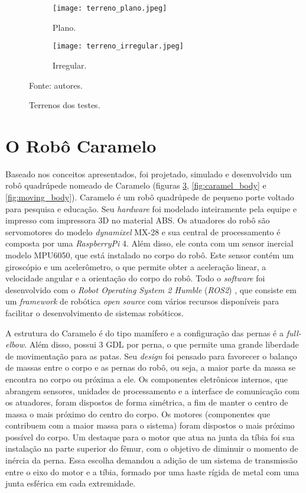 \documentclass[conference]{IEEEtran}
\begin{document}
  \begin{figure}[htbp]
    \centering
    \begin{subfigure}[htbp]{0.24\textwidth}
      \centering
      \texttt{[image: terreno\_plano.jpeg]}
      \caption{Plano.}
      \label{fig:terreno_plano}
    \end{subfigure}
    \begin{subfigure}[htbp]{0.24\textwidth}
      \centering
      \texttt{[image: terreno\_irregular.jpeg]}
      \caption{Irregular.}
      \label{fig:terreno_irregular}
    \end{subfigure}
    \vfill
    \caption{Terrenos dos testes.}
    Fonte: autores.
    \label{fig:terrenos}
  \end{figure}

\section{O Robô Caramelo}

Baseado nos conceitos apresentados, foi projetado, simulado e desenvolvido um robô quadrúpede nomeado de Caramelo (figuras \ref{fig:terrenos}, \ref{fig:caramel_body} e \ref{fig:moving_body}). Caramelo é um robô quadrúpede de pequeno porte voltado para pesquisa e educação. Seu \textit{hardware} foi modelado inteiramente pela equipe e impresso com impressora 3D no material ABS. Os atuadores do robô são servomotores do modelo \textit{dynamixel} MX-28 e sua central de processamento é composta por uma \textit{RaspberryPi} 4. Além disso, ele conta com um sensor inercial modelo MPU6050, que está instalado no corpo do robô. Este sensor contém um giroscópio e um acelerômetro, o que permite obter a aceleração linear, a velocidade angular e a orientação do corpo do robô. Todo o \textit{software} foi desenvolvido com o \textit{Robot Operating System 2 Humble} (\textit{ROS2}) \cite{ROS2Humble}, que consiste em um \textit{framework} de robótica \textit{open source} com vários recursos disponíveis para facilitar o desenvolvimento de sistemas robóticos.

A estrutura do Caramelo é do tipo mamífero e a configuração das pernas é a \textit{full-elbow}. Além disso, possui 3 GDL por perna, o que permite uma grande liberdade de movimentação para as patas. Seu \textit{design} foi pensado para favorecer o balanço de massas entre o corpo e as pernas do robô, ou seja, a maior parte da massa se encontra no corpo ou próxima a ele. Os componentes eletrônicos internos, que abrangem sensores, unidades de processamento e a interface de comunicação com os atuadores, foram dispostos de forma simétrica, a fim de manter o centro de massa o mais próximo do centro do corpo. Os motores (componentes que contribuem com a maior massa para o sistema) foram dispostos o mais próximo possível do corpo. Um destaque para o motor que atua na junta da tíbia foi sua instalação na parte superior do fêmur, com o objetivo de diminuir o momento de inércia da perna. Essa escolha demandou a adição de um sistema de transmissão entre o eixo do motor e a tíbia, formado por uma haste rígida de metal com uma junta esférica em cada extremidade.
\end{document}
